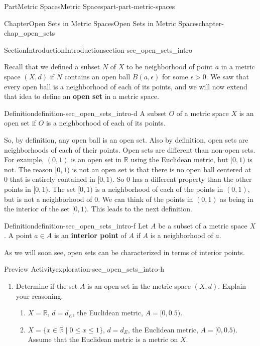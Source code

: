 \documentclass[oneside,10pt,]{book}
\newcommand{\terminology}[1]{\textbf{#1}}
\numberwithin{equation}{chapter}
\newcommand{\R}{\mathbb{R}}
\newcommand{\gt}{>}
\begin{document}
\begin{partptx}{Part}{Metric Spaces}{}{Metric Spaces}{}{}{part-part-metric-spaces}
\begin{chapterptx}{Chapter}{Open Sets in Metric Spaces}{}{Open Sets in Metric Spaces}{}{}{chapter-chap_open_sets}
\begin{sectionptx}{Section}{Introduction}{}{Introduction}{}{}{section-sec_open_sets_intro}
\par
Recall that we defined a subset \(N\) of \(X\) to be neighborhood of point \(a\) in a metric space \((X,d)\) if \(N\) contains an open ball \(B(a, \epsilon)\) for some \(\epsilon \gt 0\). We saw that every open ball is a neighborhood of each of its points, and we will now extend that idea to define an \terminology{open set} in a metric space.%
\begin{definition}{Definition}{}{definition-sec_open_sets_intro-d}%
A subset \(O\) of a metric space \(X\) is an open set if \(O\) is a neighborhood of each of its points.%
\end{definition}
So, by definition, any open ball is an open set. Also by definition, open sets are neighborhoods of each of their points. Open sets are different than non-open sets. For example, \((0,1)\) is an open set in \(\R\) using the Euclidean metric, but \([0,1)\) is not. The reason \([0,1)\) is not an open set is that there is no open ball centered at \(0\) that is entirely contained in \([0,1)\). So \(0\) has a different property than the other points in \([0,1)\). The set \([0,1)\) is a neighborhood of each of the points in \((0,1)\), but is not a neighborhood of \(0\). We can think of the points in \((0,1)\) as being in the interior of the set \([0,1)\). This leads to the next definition.%
\begin{definition}{Definition}{}{definition-sec_open_sets_intro-f}%
%
Let \(A\) be a subset of a metric space \(X\). A point \(a \in A\) is an \terminology{interior point} of \(A\) if \(A\) is a neighborhood of \(a\).%
\end{definition}
As we will soon see, open sets can be characterized in terms of interior points.%
\begin{exploration}{Preview Activity}{}{exploration-sec_open_sets_intro-h}%
\begin{enumerate}[font=\bfseries,label=(\alph*),ref=\alph*]%
\item{}Determine if the set \(A\) is an open set in the metric space \((X,d)\). Explain your reasoning.%
\begin{enumerate}[font=\bfseries,label=(\roman*),ref=\theenumi.\roman*]%
\item{}\(X = \R\), \(d = d_E\), the Euclidean metric, \(A = [0,0.5)\).%
\item{}\(X = \{x \in \R \mid 0 \leq x \leq 1\}\), \(d = d_E\), the Euclidean metric, \(A = [0,0.5)\). Assume that the Euclidean metric is a metric on \(X\).%

\end{enumerate}
\end{enumerate}
\end{exploration}
\end{sectionptx}
\end{chapterptx}
\end{partptx}
\end{document}
